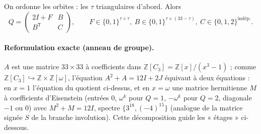 \documentclass[11pt,a4paper]{article}
\theoremstyle{remark}
\newcommand{\Z}{\mathbb{Z}}
\begin{document}
On ordonne les orbites : les $\tau$ triangulaires d'abord. Alors
\[Q=\begin{pmatrix}2I+F & B\\ B^{\mathsf T}& C\end{pmatrix},\qquad F\in\{0,1\}^{\tau\times\tau},\ B\in\{0,1\}^{\tau\times(33-\tau)},\ C\in\{0,1,2\}^{\text{indép.}}.\]

\paragraph{Reformulation exacte (anneau de groupe).} $A$ est une matrice $33\times33$ à coefficients dans $\Z[C_3]=\Z[x]/(x^3-1)$ ; comme
$\Z[C_3]\hookrightarrow\Z\times\Z[\omega]$, l'équation $A^2+A=12I+2J$ équivaut à deux équations : en $x=1$ l'équation du quotient ci-dessus, et en $x=\omega$
une matrice hermitienne $M$ à coefficients d'Eisenstein (entrées $0$, $\omega^k$ pour $Q=1$, $-\omega^k$ pour $Q=2$, diagonale $-1$ ou $0$) avec
$M^2+M=12I$, spectre $\{3^{18},(-4)^{15}\}$ (analogue de la matrice signée $S$ de la branche involution). Cette décomposition guide les « étages » ci-dessous.

\end{document}
